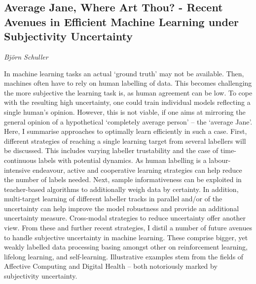 \documentclass[../booklet.tex]{subfiles}
\begin{document}
\subsection[Average Jane, Where Art Thou? - Recent Avenues in Efficient Machine Learning under Subjectivity Uncertainty. {\it Björn Schuller}]{Average Jane, Where Art Thou? - Recent Avenues in Efficient Machine Learning under Subjectivity Uncertainty}

\begin{center}
  {\it Björn Schuller}
\end{center}

\vskip 0.8cm


In machine learning tasks an actual `ground truth' may not be available. Then, machines often have to rely on human labelling of data. This becomes challenging the more subjective the learning task is, as human agreement can be low. To cope with the resulting high uncertainty, one could train individual models reflecting a single human's opinion. However, this is not viable, if one aims at mirroring the general opinion of a hypothetical `completely average person' -- the `average Jane'. Here, I summarise approaches to optimally learn efficiently in such a case. First, different strategies of reaching a single learning target from several labellers will be discussed. This includes varying labeller trustability and the case of time-continuous labels with potential dynamics. As human labelling is a labour-intensive endeavour, active and cooperative learning strategies can help reduce the number of labels needed. Next, sample informativeness can be exploited in teacher-based algorithms to additionally weigh data by certainty. In addition, multi-target learning of different labeller tracks in parallel and/or of the uncertainty can help improve the model robustness and provide an additional uncertainty measure. Cross-modal strategies to reduce uncertainty offer another view. From these and further recent strategies, I distil a number of future avenues to handle subjective uncertainty in machine learning. These comprise bigger, yet weakly labelled data processing basing amongst other on reinforcement learning, lifelong learning, and self-learning. Illustrative examples stem from the fields of Affective Computing and Digital Health -- both notoriously marked by subjectivity uncertainty.

\end{document}
